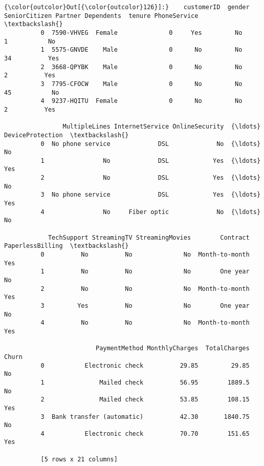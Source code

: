 \documentclass[11pt]{article}
\begin{document}
\begin{Verbatim}[commandchars=\\\{\}]
{\color{outcolor}Out[{\color{outcolor}126}]:}    customerID  gender  SeniorCitizen Partner Dependents  tenure PhoneService  \textbackslash{}
          0  7590-VHVEG  Female              0     Yes         No       1           No   
          1  5575-GNVDE    Male              0      No         No      34          Yes   
          2  3668-QPYBK    Male              0      No         No       2          Yes   
          3  7795-CFOCW    Male              0      No         No      45           No   
          4  9237-HQITU  Female              0      No         No       2          Yes   
          
                MultipleLines InternetService OnlineSecurity  {\ldots}  DeviceProtection  \textbackslash{}
          0  No phone service             DSL             No  {\ldots}                No   
          1                No             DSL            Yes  {\ldots}               Yes   
          2                No             DSL            Yes  {\ldots}                No   
          3  No phone service             DSL            Yes  {\ldots}               Yes   
          4                No     Fiber optic             No  {\ldots}                No   
          
            TechSupport StreamingTV StreamingMovies        Contract PaperlessBilling  \textbackslash{}
          0          No          No              No  Month-to-month              Yes   
          1          No          No              No        One year               No   
          2          No          No              No  Month-to-month              Yes   
          3         Yes          No              No        One year               No   
          4          No          No              No  Month-to-month              Yes   
          
                         PaymentMethod MonthlyCharges  TotalCharges Churn  
          0           Electronic check          29.85         29.85    No  
          1               Mailed check          56.95        1889.5    No  
          2               Mailed check          53.85        108.15   Yes  
          3  Bank transfer (automatic)          42.30       1840.75    No  
          4           Electronic check          70.70        151.65   Yes  
          
          [5 rows x 21 columns]
\end{Verbatim}
            
\end{document}
